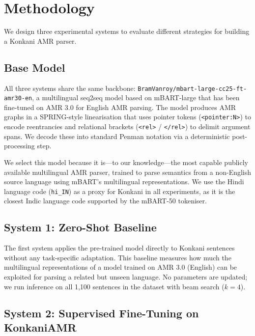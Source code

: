 \section{Methodology}
\label{sec:methodology}

We design three experimental systems to evaluate different strategies for building a Konkani AMR parser.

\subsection{Base Model}

All three systems share the same backbone: \texttt{BramVanroy/mbart-large-cc25-ft-amr30-en}, a multilingual seq2seq model based on mBART-large \cite{liu2020multilingual} that has been fine-tuned on AMR 3.0 for English AMR parsing. The model produces AMR graphs in a SPRING-style linearisation \cite{bevilacqua2021one} that uses pointer tokens (\texttt{<pointer:N>}) to encode reentrancies and relational brackets (\texttt{<rel>} / \texttt{</rel>}) to delimit argument spans. We decode these into standard Penman notation via a deterministic post-processing step.

We select this model because it is—to our knowledge—the most capable publicly available multilingual AMR parser, trained to parse semantics from a non-English source language using mBART's multilingual representations. We use the Hindi language code (\texttt{hi\_IN}) as a proxy for Konkani in all experiments, as it is the closest Indic language code supported by the mBART-50 tokeniser.

\subsection{System 1: Zero-Shot Baseline}

The first system applies the pre-trained model directly to Konkani sentences without any task-specific adaptation. This baseline measures how much the multilingual representations of a model trained on AMR 3.0 (English) can be exploited for parsing a related but unseen language. No parameters are updated; we run inference on all 1,100 sentences in the dataset with beam search ($k=4$).

\subsection{System 2: Supervised Fine-Tuning on KonkaniAMR}

